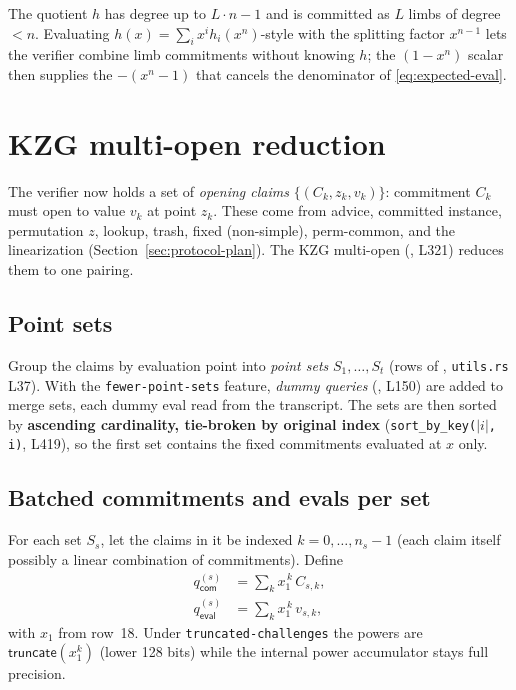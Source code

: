 \begin{remark}[Why the split $x_{\mathsf{split}} = x^{n-1}$]
The quotient $h$ has degree up to $L\cdot n - 1$ and is committed as $L$
limbs of degree $< n$. Evaluating $h(x) = \sum_i x^i h_i(x^n)$-style with
the splitting factor $x^{n-1}$ lets the verifier combine limb commitments
without knowing $h$; the $(1-x^n)$ scalar then supplies the
$-(x^n-1)$ that cancels the denominator of \eqref{eq:expected-eval}.
\end{remark}

\section{KZG multi-open reduction}
\label{sec:pcs-math}

The verifier now holds a set of \emph{opening claims}
$\{(C_k, z_k, v_k)\}$: commitment $C_k$ must open to value $v_k$ at point
$z_k$. These come from advice, committed instance, permutation $z$,
lookup, trash, fixed (non-simple), perm-common, and the linearization
(Section~\ref{sec:protocol-plan}). The KZG multi-open
(, L321) reduces them to one pairing.

\subsection{Point sets}
\label{sec:pointsets}

Group the claims by evaluation point into \emph{point sets}
$S_1, \ldots, S_t$ (rows of ,
\texttt{utils.rs} L37). With the \texttt{fewer-point-sets} feature,
\emph{dummy queries} (, L150) are added to
merge sets, each dummy eval read from the transcript. The sets are then
sorted by \textbf{ascending cardinality, tie-broken by original index}
(\texttt{sort\_\allowbreak{}by\_\allowbreak{}key($\vert i\vert$, i)}, L419), so the first set contains
the fixed commitments evaluated at $x$ only.

\subsection{Batched commitments and evals per set}
\label{sec:qcom}

For each set $S_s$, let the claims in it be indexed $k = 0, \ldots, n_s-1$
(each claim itself possibly a linear combination of commitments). Define
\begin{align}
  q_{\mathsf{com}}^{(s)} &= \sum_{k} x_1^{\,k}\, C_{s,k}, \label{eq:qcom}\\
  q_{\mathsf{eval}}^{(s)} &= \sum_{k} x_1^{\,k}\, v_{s,k}, \label{eq:qeval}
\end{align}
with $x_1$ from row~18. Under \texttt{truncated-challenges} the powers are
$\mathsf{truncate}(x_1^k)$ (lower 128 bits) while the internal power
accumulator stays full precision.

